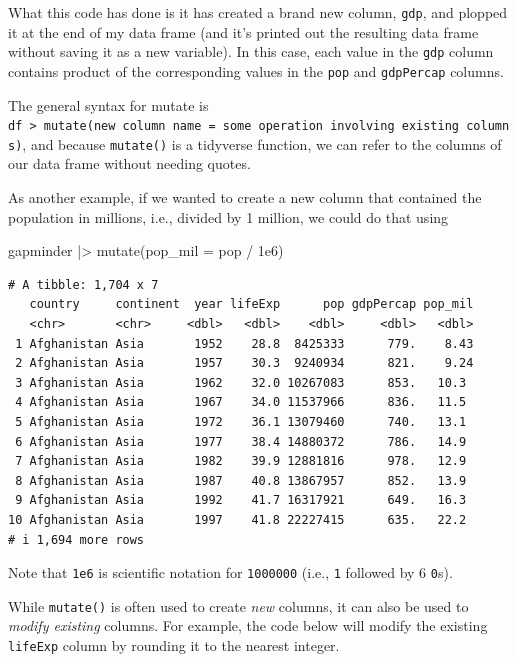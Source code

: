 \documentclass[
  letterpaper,
  DIV=11,
  numbers=noendperiod]{scrreprt}
\newenvironment{Shaded}{\begin{snugshade}}{\end{snugshade}}
\newcommand{\AttributeTok}[1]{\textcolor[rgb]{0.40,0.45,0.13}{#1}}
\newcommand{\FloatTok}[1]{\textcolor[rgb]{0.68,0.00,0.00}{#1}}
\newcommand{\FunctionTok}[1]{\textcolor[rgb]{0.28,0.35,0.67}{#1}}
\newcommand{\NormalTok}[1]{\textcolor[rgb]{0.00,0.23,0.31}{#1}}
\newcommand{\SpecialCharTok}[1]{\textcolor[rgb]{0.37,0.37,0.37}{#1}}
\begin{document}
What this code has done is it has created a brand new column,
\texttt{gdp}, and plopped it at the end of my data frame (and it's
printed out the resulting data frame without saving it as a new
variable). In this case, each value in the \texttt{gdp} column contains
product of the corresponding values in the \texttt{pop} and
\texttt{gdpPercap} columns.

The general syntax for mutate is
\texttt{df\ \textbar{}\textgreater{}\ mutate(new\ column\ name\ =\ some\ operation\ involving\ existing\ columns)},
and because \texttt{mutate()} is a tidyverse function, we can refer to
the columns of our data frame without needing quotes.

As another example, if we wanted to create a new column that contained
the population in millions, i.e., divided by 1 million, we could do that
using

\begin{Shaded}
\begin{Highlighting}[]
\NormalTok{gapminder }\SpecialCharTok{|\textgreater{}} \FunctionTok{mutate}\NormalTok{(}\AttributeTok{pop\_mil =}\NormalTok{ pop }\SpecialCharTok{/} \FloatTok{1e6}\NormalTok{)}
\end{Highlighting}
\end{Shaded}

\begin{verbatim}
# A tibble: 1,704 x 7
   country     continent  year lifeExp      pop gdpPercap pop_mil
   <chr>       <chr>     <dbl>   <dbl>    <dbl>     <dbl>   <dbl>
 1 Afghanistan Asia       1952    28.8  8425333      779.    8.43
 2 Afghanistan Asia       1957    30.3  9240934      821.    9.24
 3 Afghanistan Asia       1962    32.0 10267083      853.   10.3 
 4 Afghanistan Asia       1967    34.0 11537966      836.   11.5 
 5 Afghanistan Asia       1972    36.1 13079460      740.   13.1 
 6 Afghanistan Asia       1977    38.4 14880372      786.   14.9 
 7 Afghanistan Asia       1982    39.9 12881816      978.   12.9 
 8 Afghanistan Asia       1987    40.8 13867957      852.   13.9 
 9 Afghanistan Asia       1992    41.7 16317921      649.   16.3 
10 Afghanistan Asia       1997    41.8 22227415      635.   22.2 
# i 1,694 more rows
\end{verbatim}

Note that \texttt{1e6} is scientific notation for \texttt{1000000}
(i.e., \texttt{1} followed by 6 \texttt{0}s).

While \texttt{mutate()} is often used to create \emph{new} columns, it
can also be used to \emph{modify existing} columns. For example, the
code below will modify the existing \texttt{lifeExp} column by rounding
it to the nearest integer.
\end{document}
